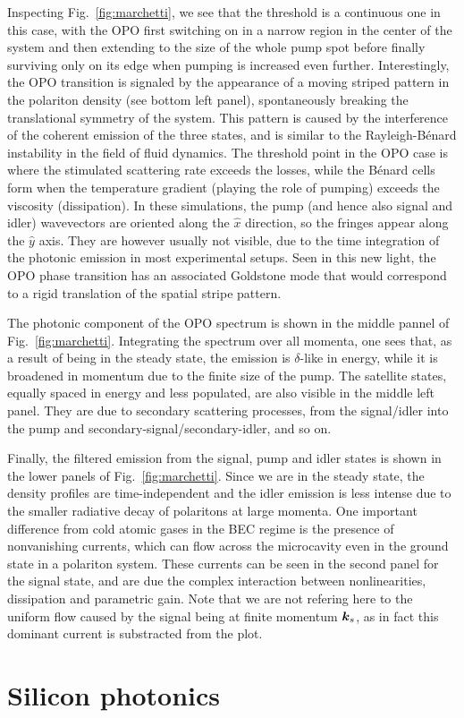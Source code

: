 Inspecting Fig.~\ref{fig:marchetti}, we see that the threshold is a
continuous one in this case, with the OPO first switching on in a
narrow region in the center of the system and then extending to the
size of the whole pump spot before finally surviving only on its edge
when pumping is increased even further. Interestingly, the OPO
transition is signaled by the appearance of a moving striped pattern
in the polariton density (see bottom left panel), spontaneously
breaking the translational symmetry of the system. This pattern is
caused by the interference of the coherent emission of the three
states, and is similar to the Rayleigh-B\'{e}nard instability in the
field of fluid dynamics. The threshold point in the OPO case is where
the stimulated scattering rate exceeds the losses, while the
B\'{e}nard cells form when the temperature gradient (playing the role
of pumping) exceeds the viscosity (dissipation). In these simulations,
the pump (and hence also signal and idler) wavevectors are oriented
along the $\hat{x}$ direction, so the fringes appear along the
$\hat{y}$ axis. They are however usually not visible, due to the time
integration of the photonic emission in most experimental setups. Seen
in this new light, the OPO phase transition has an associated
Goldstone mode that would correspond to a rigid translation of the
spatial stripe pattern.

The photonic component of the OPO spectrum is shown in the middle
pannel of Fig.~\ref{fig:marchetti}. Integrating the spectrum over all
momenta, one sees that, as a result of being in the steady state, the
emission is $\delta$-like in energy, while it is broadened in momentum
due to the finite size of the pump. The satellite states, equally
spaced in energy and less populated, are also visible in the middle
left panel. They are due to secondary scattering processes, from the
signal/idler into the pump and secondary-signal/secondary-idler, and
so on.

Finally, the filtered emission from the signal, pump and idler states
is shown in the lower panels of Fig.~\ref{fig:marchetti}. Since we are
in the steady state, the density profiles are time-independent and
the idler emission is less intense due to the smaller radiative decay
of polaritons at large momenta. One important difference from cold
atomic gases in the BEC regime is the presence of nonvanishing
currents, which can flow across the microcavity even in the ground
state in a polariton system. These currents can be seen in the second
panel for the signal state, and are due the complex interaction
between nonlinearities, dissipation and parametric gain. Note that we
are not refering here to the uniform flow caused by the signal being
at finite momentum $\bm{k}_s$, as in fact this dominant current is
substracted from the plot.


\chapter{Silicon photonics}
\label{cha:silicon-photonics}


